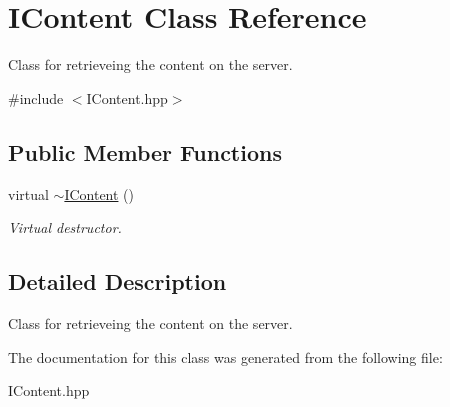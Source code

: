 \hypertarget{class_i_content}{}\section{I\+Content Class Reference}
\label{class_i_content}


Class for retrieveing the content on the server.  




{\ttfamily \#include $<$I\+Content.\+hpp$>$}

\subsection*{Public Member Functions}
\begin{DoxyCompactItemize}
\item 
\hypertarget{class_i_content_a7804cb902e263b84dc55a357ef9661b9}{}virtual \hyperlink{class_i_content_a7804cb902e263b84dc55a357ef9661b9}{$\sim$\+I\+Content} ()\label{class_i_content_a7804cb902e263b84dc55a357ef9661b9}

\begin{DoxyCompactList}\small\item\em Virtual destructor. \end{DoxyCompactList}\end{DoxyCompactItemize}


\subsection{Detailed Description}
Class for retrieveing the content on the server. 

The documentation for this class was generated from the following file\+:\begin{DoxyCompactItemize}
\item 
I\+Content.\+hpp\end{DoxyCompactItemize}

